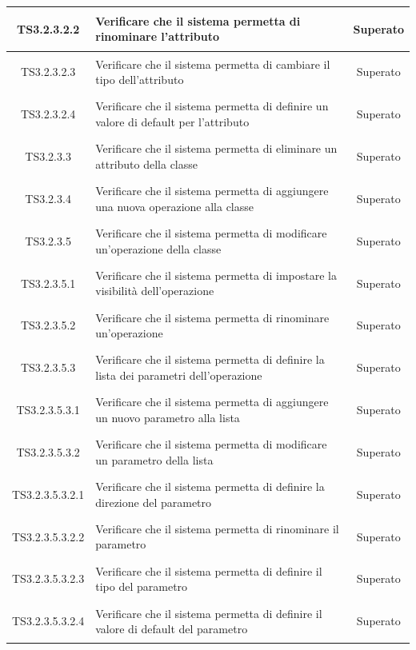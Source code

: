 \documentclass[../PianoDiQualifica.tex]{subfiles}
\begin{document}
\begin{longtable}{|c|>{\centering}p{10cm}|c|}
	\hline
	\hypertarget{TS3.2.3.2.2}{TS3.2.3.2.2} & Verificare che il sistema permetta di rinominare l'attributo & Superato \\
	\hline
	\hypertarget{TS3.2.3.2.3}{TS3.2.3.2.3} & Verificare che il sistema permetta di cambiare il tipo dell'attributo & Superato \\
	\hline
	\hypertarget{TS3.2.3.2.4}{TS3.2.3.2.4} & Verificare che il sistema permetta di definire un valore di default per l'attributo & Superato \\
	\hline
	\hypertarget{TS3.2.3.3}{TS3.2.3.3} & Verificare che il sistema permetta di eliminare un attributo della classe & Superato \\
	\hline
	\hypertarget{TS3.2.3.4}{TS3.2.3.4} & Verificare che il sistema permetta di aggiungere una nuova operazione alla classe & Superato \\
	\hline
	\hypertarget{TS3.2.3.5}{TS3.2.3.5} & Verificare che il sistema permetta di modificare un'operazione della classe & Superato \\
	\hline
	\hypertarget{TS3.2.3.5.1}{TS3.2.3.5.1} & Verificare che il sistema permetta di impostare la visibilità dell'operazione & Superato \\
	\hline
	\hypertarget{TS3.2.3.5.2}{TS3.2.3.5.2} & Verificare che il sistema permetta di rinominare un'operazione & Superato \\
	\hline
	\hypertarget{TS3.2.3.5.3}{TS3.2.3.5.3} & Verificare che il sistema permetta di definire la lista dei parametri dell'operazione & Superato \\
	\hline
	\hypertarget{TS3.2.3.5.3.1}{TS3.2.3.5.3.1} & Verificare che il sistema permetta di aggiungere un nuovo parametro alla lista & Superato \\
	\hline
	\hypertarget{TS3.2.3.5.3.2}{TS3.2.3.5.3.2} & Verificare che il sistema permetta di modificare un parametro della lista & Superato\\
	\hline
	\hypertarget{TS3.2.3.5.3.2.1}{TS3.2.3.5.3.2.1} & Verificare che il sistema permetta di definire la direzione del parametro & Superato \\
	\hline
	\hypertarget{TS3.2.3.5.3.2.2}{TS3.2.3.5.3.2.2} & Verificare che il sistema permetta di rinominare il parametro & Superato \\
	\hline
	\hypertarget{TS3.2.3.5.3.2.3}{TS3.2.3.5.3.2.3} & Verificare che il sistema permetta di definire il tipo del parametro & Superato \\
	\hline
	\hypertarget{TS3.2.3.5.3.2.4}{TS3.2.3.5.3.2.4} & Verificare che il sistema permetta di definire il valore di default del parametro & Superato \\

\end{longtable}
\end{document}
